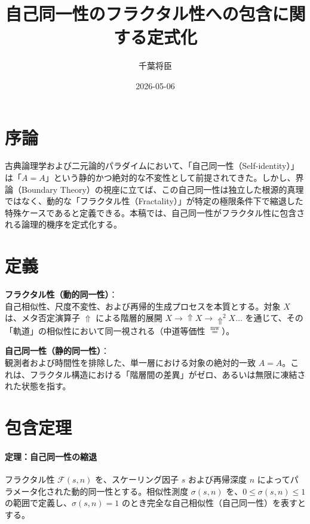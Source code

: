 \documentclass[11pt,a4paper]{ltjsarticle}
\title{自己同一性のフラクタル性への包含に関する定式化}
\author{千葉将臣}
\date{2026-05-06}
\begin{document}
\maketitle

\section{序論}
古典論理学および二元論的パラダイムにおいて、「自己同一性（Self-identity）」は「$A=A$」という静的かつ絶対的な不変性として前提されてきた。しかし、界論（Boundary Theory）の視座に立てば、この自己同一性は独立した根源的真理ではなく、動的な「フラクタル性（Fractality）」が特定の極限条件下で縮退した特殊ケースであると定義できる。本稿では、自己同一性がフラクタル性に包含される論理的機序を定式化する。

\section{定義}

\begin{description}[style=multiline, leftmargin=3.5cm]
    \item[定義 1.1] \textbf{フラクタル性（動的同一性）}：\\
    自己相似性、尺度不変性、および再帰的生成プロセスを本質とする。対象 $X$ は、メタ否定演算子 $\Uparrow$ による階層的展開 $X \to \Uparrow X \to \Uparrow^2 X \dots$ を通じて、その「軌道」の相似性において同一視される（中道等価性 $\mathrel{\overset{\mathrm{mw}}{=}}$）。
    
    \item[定義 1.2] \textbf{自己同一性（静的同一性）}：\\
    観測者および時間性を排除した、単一層における対象の絶対的一致 $A=A$。これは、フラクタル構造における「階層間の差異」がゼロ、あるいは無限に凍結された状態を指す。
\end{description}

\section{包含定理}

\paragraph{定理：自己同一性の縮退}

フラクタル性 $\mathcal{F}(s, n)$ を、スケーリング因子 $s$ および再帰深度 $n$ によってパラメータ化された動的同一性とする。相似性測度 $\sigma(s, n)$ を、$0 \leq \sigma(s, n) \leq 1$ の範囲で定義し、$\sigma(s, n) = 1$ のとき完全な自己相似性（自己同一性）を表すとする。
\end{document}
